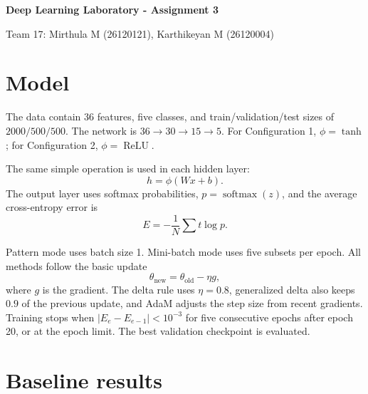 \documentclass[10pt,a4paper]{article}
\begin{document}
\begin{center}
    {\Large\bfseries Deep Learning Laboratory - Assignment 3}\par
    \vspace{1mm}
    {\small Team 17: Mirthula M (26120121), Karthikeyan M (26120004)}
\end{center}

\section*{Model}

The data contain 36 features, five classes, and train/validation/test sizes of
$2000/500/500$. The network is $36\!\rightarrow\!30\!\rightarrow\!15\!\rightarrow\!5$.
For Configuration 1, $\phi=\tanh$; for Configuration 2, $\phi=\operatorname{ReLU}$.

The same simple operation is used in each hidden layer:
\[
    h=\phi(Wx+b).
\]
The output layer uses softmax probabilities, $p=\operatorname{softmax}(z)$, and
the average cross-entropy error is
\[
    E=-\frac{1}{N}\sum t\log p.
\]

Pattern mode uses batch size 1. Mini-batch mode uses five subsets per epoch.
All methods follow the basic update
\[
    \theta_{\mathrm{new}}=\theta_{\mathrm{old}}-\eta g,
\]
where $g$ is the gradient. The delta rule uses $\eta=0.8$, generalized delta
also keeps $0.9$ of the previous update, and AdaM adjusts the step size from
recent gradients.
Training stops when $|E_e-E_{e-1}|<10^{-3}$ for five consecutive epochs after
epoch 20, or at the epoch limit. The best validation checkpoint is evaluated.

\section*{Baseline results}
\end{document}

